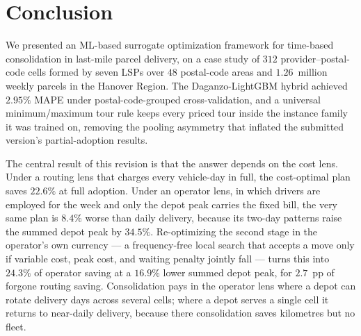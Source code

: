 \documentclass[preprint,12pt,authoryear]{elsarticle}
\begin{document}
\section{Conclusion}
\label{concl}

We presented an ML-based surrogate optimization framework for time-based consolidation in last-mile parcel delivery, on a case study of $312$ provider--postal-code cells formed by seven LSPs over $48$ postal-code areas and $1.26$~million weekly parcels in the Hanover Region. The Daganzo-LightGBM hybrid achieved $2.95\%$ MAPE under postal-code-grouped cross-validation, and a universal minimum/maximum tour rule keeps every priced tour inside the instance family it was trained on, removing the pooling asymmetry that inflated the submitted version's partial-adoption results.

The central result of this revision is that the answer depends on the cost lens. Under a routing lens that charges every vehicle-day in full, the cost-optimal plan saves $22.6\%$ at full adoption. Under an operator lens, in which drivers are employed for the week and only the depot peak carries the fixed bill, the very same plan is $8.4\%$ worse than daily delivery, because its two-day patterns raise the summed depot peak by $34.5\%$. Re-optimizing the second stage in the operator's own currency --- a frequency-free local search that accepts a move only if variable cost, peak cost, and waiting penalty jointly fall --- turns this into $24.3\%$ of operator saving at a $16.9\%$ lower summed depot peak, for $2.7$~pp of forgone routing saving. Consolidation pays in the operator lens where a depot can rotate delivery days across several cells; where a depot serves a single cell it returns to near-daily delivery, because there consolidation saves kilometres but no fleet.
\end{document}

